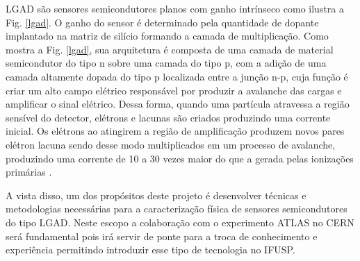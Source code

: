 LGAD são sensores semicondutores planos com ganho intrínseco como ilustra a Fig. \ref{lgad}. O ganho do sensor é determinado pela quantidade de dopante implantado na matriz de silício formando a camada de multiplicação. Como mostra a Fig. \ref{lgad}, sua arquitetura é composta de uma camada de material semicondutor do tipo n sobre uma camada do tipo p, com a adição de uma camada altamente dopada do tipo p localizada entre a junção n-p, cuja função é criar um alto campo elétrico responsável por produzir a avalanche das cargas e amplificar o sinal elétrico. Dessa forma, quando uma partícula atravessa a região sensível do detector, elétrons e lacunas são criados produzindo uma corrente inicial. Os elétrons ao atingirem a região de amplificação produzem novos pares elétron lacuna sendo desse modo multiplicados em um processo de avalanche, produzindo uma corrente de 10 a 30 vezes maior do que a gerada pelas ionizações primárias \cite{JIN_LGAD,NIMA_LGAD_III}. 

A vista disso, um dos propósitos deste projeto é desenvolver técnicas e metodologias necessárias para a caracterização física de sensores semicondutores do tipo LGAD. Neste escopo a colaboração com o experimento ATLAS no CERN será fundamental pois irá servir de ponte para a troca de conhecimento e experiência permitindo introduzir esse tipo de tecnologia no IFUSP.



